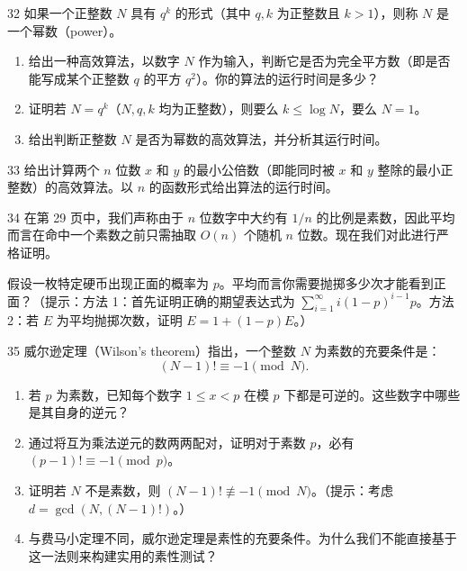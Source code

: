 \begin{exercise}{32}
如果一个正整数 $N$ 具有 $q^k$ 的形式（其中 $q, k$ 为正整数且 $k > 1$），则称 $N$ 是一个幂数（power）。
\begin{enumerate}
    \item[(a)] 给出一种高效算法，以数字 $N$ 作为输入，判断它是否为完全平方数（即是否能写成某个正整数 $q$ 的平方 $q^2$）。你的算法的运行时间是多少？
    \item[(b)] 证明若 $N = q^k$（$N, q, k$ 均为正整数），则要么 $k \le \log N$，要么 $N = 1$。
    \item[(c)] 给出判断正整数 $N$ 是否为幂数的高效算法，并分析其运行时间。
\end{enumerate}
\end{exercise}

\begin{exercise}{33}
给出计算两个 $n$ 位数 $x$ 和 $y$ 的最小公倍数（即能同时被 $x$ 和 $y$ 整除的最小正整数）的高效算法。以 $n$ 的函数形式给出算法的运行时间。
\end{exercise}

\begin{exercise}{34}
在第 29 页中，我们声称由于 $n$ 位数字中大约有 $1/n$ 的比例是素数，因此平均而言在命中一个素数之前只需抽取 $O(n)$ 个随机 $n$ 位数。现在我们对此进行严格证明。

假设一枚特定硬币出现正面的概率为 $p$。平均而言你需要抛掷多少次才能看到正面？（提示：方法 1：首先证明正确的期望表达式为 $\sum_{i=1}^\infty i(1-p)^{i-1} p$。方法 2：若 $E$ 为平均抛掷次数，证明 $E = 1 + (1-p)E$。）
\end{exercise}

\begin{exercise}{35}
威尔逊定理（Wilson's theorem）指出，一个整数 $N$ 为素数的充要条件是：
\[
(N - 1)! \equiv -1 \pmod N.
\]
\begin{enumerate}
    \item[(a)] 若 $p$ 为素数，已知每个数字 $1 \le x < p$ 在模 $p$ 下都是可逆的。这些数字中哪些是其自身的逆元？
    \item[(b)] 通过将互为乘法逆元的数两两配对，证明对于素数 $p$，必有 $(p - 1)! \equiv -1 \pmod p$。
    \item[(c)] 证明若 $N$ 不是素数，则 $(N - 1)! \not\equiv -1 \pmod N$。（提示：考虑 $d = \gcd(N, (N - 1)!)$。）
    \item[(d)] 与费马小定理不同，威尔逊定理是素性的充要条件。为什么我们不能直接基于这一法则来构建实用的素性测试？
\end{enumerate}
\end{exercise}

